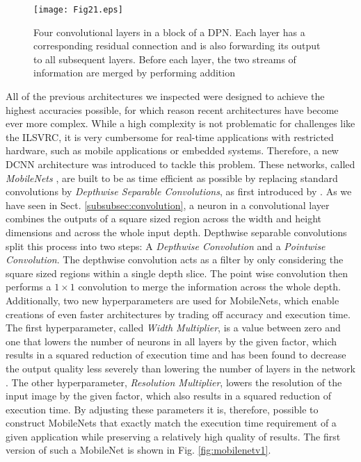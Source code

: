 \documentclass[conference]{IEEEtran}
\begin{document}
\begin{figure*}
\texttt{[image: Fig21.eps]}
\caption{Four convolutional layers in a block of a DPN. Each layer has a corresponding residual connection and is also forwarding its output to all subsequent layers. Before each layer, the two streams of information are merged by performing addition}
\label{fig:dpn}
\end{figure*}

All of the previous architectures we inspected were designed to achieve the highest accuracies possible, for which reason recent architectures have become ever more complex. While a high complexity is not problematic for challenges like the ILSVRC, it is very cumbersome for real-time applications with restricted hardware, such as mobile applications or embedded systems. Therefore, a new DCNN architecture was introduced to tackle this problem. These networks, called \emph{MobileNets} \cite{MobileNets}, are built to be as time efficient as possible by replacing standard convolutions by \emph{Depthwise Separable Convolutions}, as first introduced by \cite{DSConv}. As we have seen in Sect. \ref{subsubsec:convolution}, a neuron in a convolutional layer combines the outputs of a square sized region across the width and height dimensions and across the whole input depth. Depthwise separable convolutions split this process into two steps: A \emph{Depthwise Convolution} and a \emph{Pointwise Convolution}. The depthwise convolution acts as a filter by only considering the square sized regions within a single depth slice. The point wise convolution then performs a $1\times1$ convolution to merge the information across the whole depth. Additionally, two new hyperparameters are used for MobileNets, which enable creations of even faster architectures by trading off accuracy and execution time. The first hyperparameter, called \emph{Width Multiplier}, is a value between zero and one that lowers the number of neurons in all layers by the given factor, which results in a squared reduction of execution time and has been found to decrease the output quality less severely than lowering the number of layers in the network \cite{MobileNets}. The other hyperparameter, \emph{Resolution Multiplier}, lowers the resolution of the input image by the given factor, which also results in a squared reduction of execution time. By adjusting these parameters it is, therefore, possible to construct MobileNets that exactly match the execution time requirement of a given application while preserving a relatively high quality of results. The first version of such a MobileNet is shown in Fig. \ref{fig:mobilenetv1}.
\end{document}
